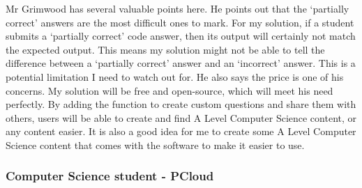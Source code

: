 \documentclass[a4paper]{report}
\begin{document}
Mr Grimwood has several valuable points here. He points out that the `partially correct' answers are the most difficult ones to mark. For my solution, if a student submits a `partially correct' code answer, then its output will certainly not match the expected output. This means my solution might not be able to tell the difference between a `partially correct' answer and an `incorrect' answer. This is a potential limitation I need to watch out for. He also says the price is one of his concerns. My solution will be free and open-source, which will meet his need perfectly. By adding the function to create custom questions and share them with others, users will be able to create and find A Level Computer Science content, or any content easier. It is also a good idea for me to create some A Level Computer Science content that comes with the software to make it easier to use.

\subsubsection{Computer Science student - PCloud}
\end{document}

